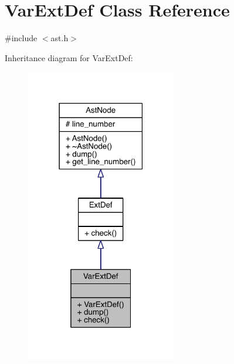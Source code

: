 \hypertarget{class_var_ext_def}{}\section{Var\+Ext\+Def Class Reference}
\label{class_var_ext_def}


{\ttfamily \#include $<$ast.\+h$>$}



Inheritance diagram for Var\+Ext\+Def\+:\nopagebreak
\begin{figure}[H]
\begin{center}
\leavevmode
\includegraphics[width=186pt]{class_var_ext_def__inherit__graph}
\end{center}
\end{figure}


